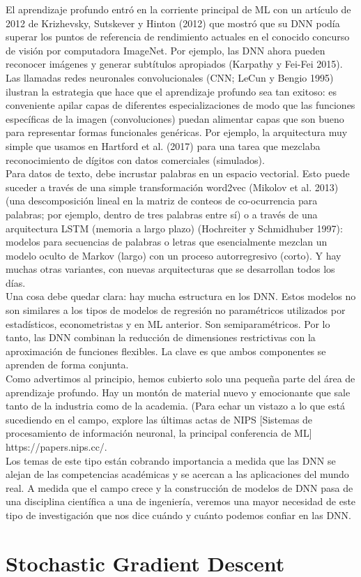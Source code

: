El aprendizaje profundo entró en la corriente principal de ML con un artículo de 2012 de Krizhevsky, Sutskever y Hinton (2012) que mostró que su DNN podía superar los puntos de referencia de rendimiento actuales en el conocido concurso de visión por computadora ImageNet. Por ejemplo, las DNN ahora pueden reconocer imágenes y generar subtítulos apropiados (Karpathy y Fei-Fei 2015).\\
Las llamadas redes neuronales convolucionales (CNN; LeCun y Bengio 1995) ilustran la estrategia que hace que el aprendizaje profundo sea tan exitoso: es conveniente apilar capas de diferentes especializaciones de modo que las funciones específicas de la imagen (convoluciones) puedan alimentar capas que son bueno para representar formas funcionales genéricas. Por ejemplo, la arquitectura muy simple que usamos en Hartford et al. (2017) para una tarea que mezclaba reconocimiento de dígitos con datos comerciales (simulados).\\
Para datos de texto, debe incrustar palabras en un espacio vectorial. Esto puede suceder a través de una simple transformación word2vec (Mikolov et al. 2013) (una descomposición lineal en la matriz de conteos de co-ocurrencia para palabras; por ejemplo, dentro de tres palabras entre sí) o a través de una arquitectura LSTM (memoria a largo plazo) (Hochreiter y Schmidhuber 1997): modelos para secuencias de palabras o letras que esencialmente mezclan un modelo oculto de Markov (largo) con un proceso autorregresivo (corto). Y hay muchas otras variantes, con nuevas arquitecturas que se desarrollan todos los días.\\
Una cosa debe quedar clara: hay mucha estructura en los DNN. Estos modelos no son similares a los tipos de modelos de regresión no paramétricos utilizados por estadísticos, econometristas y en ML anterior. Son semiparamétricos. Por lo tanto, las DNN combinan la reducción de dimensiones restrictivas con la aproximación de funciones flexibles. La clave es que ambos componentes se aprenden de forma conjunta.\\
Como advertimos al principio, hemos cubierto solo una pequeña parte del área de aprendizaje profundo. Hay un montón de material nuevo y emocionante que sale tanto de la industria como de la academia. (Para echar un vistazo a lo que está sucediendo en el campo, explore las últimas actas de NIPS [Sistemas de procesamiento de información neuronal, la principal conferencia de ML] https://papers.nips.cc/.\\
Los temas de este tipo están cobrando importancia a medida que las DNN se alejan de las competencias académicas y se acercan a las aplicaciones del mundo real. A medida que el campo crece y la construcción de modelos de DNN pasa de una disciplina científica a una de ingeniería, veremos una mayor necesidad de este tipo de investigación que nos dice cuándo y cuánto podemos confiar en las DNN.


\section{Stochastic Gradient Descent}



